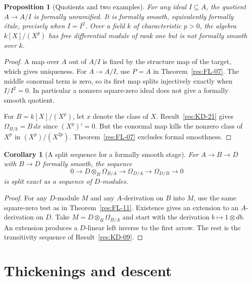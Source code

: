 \documentclass[11pt,oneside,openany]{book}
\newtheorem{proposition}[theorem]{Proposition}
\newtheorem{corollary}[theorem]{Corollary}
\theoremstyle{definition}
\theoremstyle{remark}
\begin{document}
\begin{proposition}[Quotients and two examples]\label{res:FL-12}
For any ideal $I\subseteq A$, the quotient $A\to A/I$ is formally unramified.
It is formally smooth, equivalently formally \'{e}tale, precisely when
$I=I^2$. Over a field $k$ of characteristic $p>0$, the algebra
$k[X]/(X^p)$ has free differential module of rank one but is not formally
smooth over $k$.
\end{proposition}
\begin{proof}
A map over $A$ out of $A/I$ is fixed by the structure map of the target,
which gives uniqueness. For $A\to A/I$, use $P=A$ in
Theorem~\ref{res:FL-07}. The middle conormal term is zero, so its first
map splits injectively exactly when $I/I^2=0$. In particular a nonzero
square-zero ideal does not give a formally smooth quotient.

For $B=k[X]/(X^p)$, let $x$ denote the class of $X$.
Result~\ref{res:KD-21} gives $\Omega_{B/k}=B\,dx$ since $(X^p)'=0$.
But the conormal map kills the nonzero class of $X^p$ in
$(X^p)/(X^{2p})$. Theorem~\ref{res:FL-07} excludes formal smoothness.
\end{proof}

\begin{corollary}[A split sequence for a formally smooth stage]\label{res:FL-13}
For $A\to B\to D$ with $B\to D$ formally smooth, the sequence
\[
  0\to D\otimes_B\Omega_{B/A}\to\Omega_{D/A}
    \to\Omega_{D/B}\to 0
\]
is split exact as a sequence of $D$-modules.
\end{corollary}
\begin{proof}
For any $D$-module $M$ and any $A$-derivation on $B$ into $M$, use the same
square-zero test as in Theorem~\ref{res:FL-11}. Existence gives an extension
to an $A$-derivation on $D$. Take $M=D\otimes_B\Omega_{B/A}$ and start
with the derivation $b\mapsto1\otimes db$. An extension produces a $D$-linear
left inverse to the first arrow. The rest is the transitivity sequence
of Result~\ref{res:KD-09}.
\end{proof}

\section{Thickenings and descent}
\end{document}
